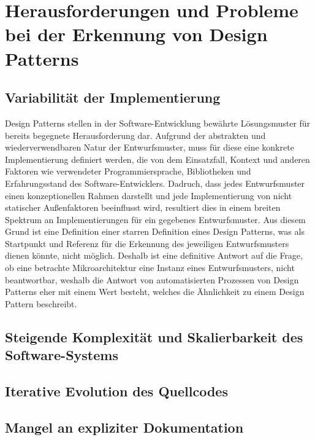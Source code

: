 \section{Herausforderungen und Probleme bei der Erkennung von Design Patterns}

\subsection{Variabilität der Implementierung}

Design Patterns stellen in der Software-Entwicklung bewährte Lösungsmuster für bereits begegnete Herausforderung dar. Aufgrund der abstrakten und wiederverwendbaren Natur der Entwurfsmuster,
muss für diese eine konkrete Implementierung definiert werden, die von dem Einsatzfall, Kontext und anderen Faktoren wie verwendeter Programmiersprache, Bibliotheken und Erfahrungsstand des Software-Entwicklers.
Dadruch, dass jedes Entwurfsmuster einen konzeptionellen Rahmen darstellt und jede Implementierung von nicht statischer Außenfaktoren beeinflusst wird, resultiert dies in einem breiten Spektrum an Implementierungen für ein gegebenes Entwurfsmuster.
Aus diesem Grund ist eine Definition einer starren Definition eines Design Patterns, was als Startpunkt und Referenz für die Erkennung des jeweiligen Entwurfsmusters dienen könnte, nicht möglich. 
Deshalb ist eine definitive Antwort auf die Frage, ob eine betrachte Mikroarchitektur eine Instanz eines Entwurfsmusters, nicht beantwortbar, weshalb die Antwort von automatisierten Prozessen von Design Patterns eher mit einem Wert besteht,
welches die Ähnlichkeit zu einem Design Pattern beschreibt.

\subsection{Steigende Komplexität und Skalierbarkeit des Software-Systems}

\subsection{Iterative Evolution des Quellcodes}

\subsection{Mangel an expliziter Dokumentation}

